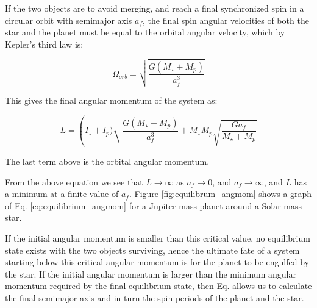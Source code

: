 If the two objects are to avoid merging, and reach a final synchronized spin in
a circular orbit with semimajor axis $a_f$, the final spin angular velocities of
both the star and the planet must be equal to the orbital angular velocity,
which by Kepler's third law is:

\begin{equation}
%
    \Omega_{orb} = \sqrt{\frac{G (M_\star + M_p)}{a_f^3}}
%
\end{equation}

This gives the final angular momentum of the system as:

\begin{equation}
%
    L
%
    =
%
    \left(I_\star + I_p) \sqrt{\frac{G (M_\star + M_p)}{a_f^3}}
%
    +
%
    M_\star M_p \sqrt{\frac{G a_f}{M_\star + M_p}}
%
    \label{eq:equilibrium_angmom}
%
\end{equation}

The last term above is the orbital angular momentum.

From the above equation we see that $L \rightarrow \infty$ as $a_f \rightarrow
0$, and $a_f \rightarrow \infty$, and $L$ has a minimum at a finite value of
$a_f$. Figure \ref{fig:equilibrum_angmom} shows a graph of Eq.
\ref{eq:equilibrium_angmom} for a Jupiter mass planet around a Solar mass star.

If the initial angular momentum is smaller than this critical value, no
equilibrium state exists with the two objects surviving, hence the ultimate fate
of a system starting below this critical angular momentum is for the planet to
be engulfed by the star. If the initial angular momentum is larger than the
minimum angular momentum required by the final equilibrium state, then Eq.
\label{eq:equilibrium_angmom} allows us to calculate the final semimajor axis
and in turn the spin periods of the planet and the star.

